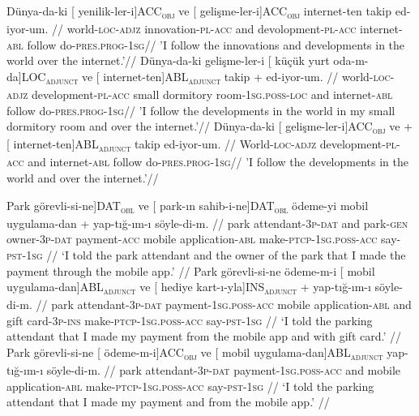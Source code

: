 \pex[exno=TS11,glspace=!1em,everygla={},everyglb={},aboveglbskip=-.15ex, interpartskip=15pt]
\label{TS11-case}
\a
\begingl
\gla Dünya-da-ki {[} yenilik-ler-i{]}ACC\textsubscript{\textsc{obj}} ve {[} gelişme-ler-i{]}ACC\textsubscript{\textsc{obj}} internet-ten takip ed-iyor-um. //
\glb world-\textsc{loc}-\textsc{adjz} innovation-\textsc{pl}-\textsc{acc} and devolopment-\textsc{pl}-\textsc{acc} internet-\textsc{abl} follow do-\textsc{pres.prog}-\textsc{1sg}//
\glft'I follow the innovations and developments in the world over the internet.'//
\endgl
\a
\begingl
\gla Dünya-da-ki gelişme-ler-i {[} küçük yurt oda-m-da{]}LOC\textsubscript{\textsc{adjunct}} ve {[} internet-ten{]}ABL\textsubscript{\textsc{adjunct}} takip + ed-iyor-um. //
\glb world-\textsc{loc}-\textsc{adjz} development-\textsc{pl}-\textsc{acc} small dormitory room-\textsc{1sg.poss}-\textsc{loc} and internet-\textsc{abl} follow do-\textsc{pres.prog}-\textsc{1sg}//
\glft'I follow the developments in the world in my small dormitory room and over the internet.'//
\endgl
\a
\begingl
\gla Dünya-da-ki {[} gelişme-ler-i{]}ACC\textsubscript{\textsc{obj}} ve + {[} internet-ten{]}ABL\textsubscript{\textsc{adjunct}} takip ed-iyor-um. //
\glb World-\textsc{loc}-\textsc{adjz} development-\textsc{pl}-\textsc{acc} and internet-\textsc{abl} follow do-\textsc{pres.prog}-\textsc{1sg}//
\glft'I follow the developments in the world and over the internet.'//
\endgl
\xe

\pex[exno=TS12,glspace=!1em,everygla={},everyglb={},aboveglbskip=-.15ex, interpartskip=15pt]
\label{TS12-case}
\a
\begingl
\gla {[} Park görevli-si-ne{]}DAT\textsubscript{\textsc{obl}} ve {[} park-ın sahib-i-ne{]}DAT\textsubscript{\textsc{obl}} ödeme-yi mobil uygulama-dan + yap-tığ-ım-ı söyle-di-m. //
\glb park attendant-\textsc{3p}-\textsc{dat} and park-\textsc{gen} owner-\textsc{3p}-\textsc{dat} payment-\textsc{acc} mobile application-\textsc{abl} make-\textsc{ptcp}-\textsc{1sg.poss}-\textsc{acc} say-\textsc{pst}-\textsc{1sg} //
\glft `I told the park attendant and the owner of the park that I made the payment through the mobile app.' //
\endgl
\a
\begingl
\gla Park görevli-si-ne ödeme-m-i {[} mobil uygulama-dan{]}ABL\textsubscript{\textsc{adjunct}} ve {[} hediye kart-ı-yla{]}INS\textsubscript{\textsc{adjunct}} + yap-tığ-ım-ı söyle-di-m. //
\glb park attendant-\textsc{3p}-\textsc{dat} payment-\textsc{1sg.poss}-\textsc{acc} mobile application-\textsc{abl} and gift card-\textsc{3p}-\textsc{ins} make-\textsc{ptcp}-\textsc{1sg.poss}-\textsc{acc} say-\textsc{pst}-\textsc{1sg} //
\glft `I told the parking attendant that I made my payment from the mobile app and with gift card.' //
\endgl
\a
\begingl
\gla Park görevli-si-ne {[} ödeme-m-i{]}ACC\textsubscript{\textsc{obj}} ve {[} mobil uygulama-dan{]}ABL\textsubscript{\textsc{adjunct}} yap-tığ-ım-ı söyle-di-m. //
\glb park attendant-\textsc{3p}-\textsc{dat} payment-\textsc{1sg.poss}-\textsc{acc} and mobile application-\textsc{abl} make-\textsc{ptcp}-\textsc{1sg.poss}-\textsc{acc} say-\textsc{pst}-\textsc{1sg} //
\glft `I told the parking attendant that I made my payment and from the mobile app.' //
\endgl
\xe
